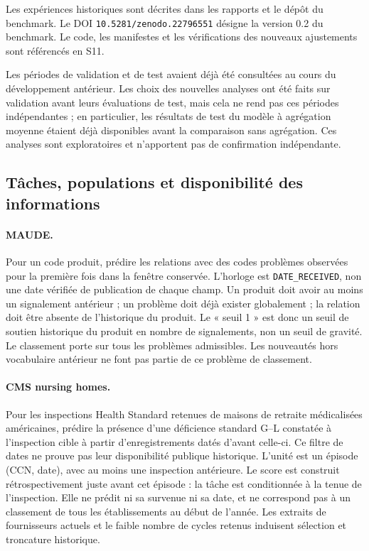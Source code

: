 Les expériences historiques sont décrites dans les rapports et le dépôt du benchmark\cite{hgb2026,hgbcontract,hgbresults,hgbpartd,hgbanalysis,hgbcode}. Le DOI \nolinkurl{10.5281/zenodo.22796551} désigne la version 0.2 du benchmark. Le code, les manifestes et les vérifications des nouveaux ajustements sont référencés en S11.

Les périodes de validation et de test avaient déjà été consultées au cours du développement antérieur. Les choix des nouvelles analyses ont été faits sur validation avant leurs évaluations de test, mais cela ne rend pas ces périodes indépendantes ; en particulier, les résultats de test du modèle à agrégation moyenne étaient déjà disponibles avant la comparaison sans agrégation. Ces analyses sont exploratoires et n'apportent pas de confirmation indépendante.

\subsection{Tâches, populations et disponibilité des informations}
\label{sec:tasks}

\paragraph{MAUDE.} Pour un code produit, prédire les relations avec des codes problèmes observées pour la première fois dans la fenêtre conservée. L'horloge est \texttt{DATE\_RECEIVED}, non une date vérifiée de publication de chaque champ. Un produit doit avoir au moins un signalement antérieur ; un problème doit déjà exister globalement ; la relation doit être absente de l'historique du produit. Le « seuil 1 » est donc un seuil de soutien historique du produit en nombre de signalements, non un seuil de gravité. Le classement porte sur tous les problèmes admissibles. Les nouveautés hors vocabulaire antérieur ne font pas partie de ce problème de classement\cite{hgbcontract,hgbcode}.

\paragraph{CMS nursing homes.} Pour les inspections Health Standard retenues de maisons de retraite médicalisées américaines, prédire la présence d'une déficience standard G--L constatée à l'inspection cible à partir d'enregistrements datés d'avant celle-ci. Ce filtre de dates ne prouve pas leur disponibilité publique historique. L'unité est un épisode (CCN, date), avec au moins une inspection antérieure. Le score est construit rétrospectivement juste avant cet épisode : la tâche est conditionnée à la tenue de l'inspection. Elle ne prédit ni sa survenue ni sa date, et ne correspond pas à un classement de tous les établissements au début de l'année. Les extraits de fournisseurs actuels et le faible nombre de cycles retenus induisent sélection et troncature historique\cite{cmsnursing,hgbcontract,hgbcode}.

